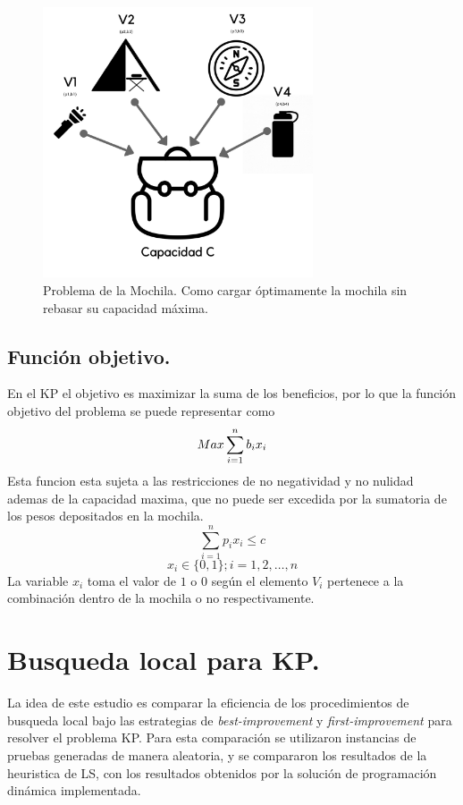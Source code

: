 \documentclass{ci5652}
\begin{document}
 	\begin{figure}[h]
 	\caption{Problema de la Mochila. Como cargar óptimamente la mochila sin rebasar su capacidad máxima.}
	\includegraphics[width=8cm, height=8cm]{KP.png}
	\end{figure}
	\subsection{Función objetivo.}
	En el KP el objetivo es maximizar la suma de los beneficios, por lo que la función objetivo del problema se puede representar como
	$$
		Max \sum_{i=1}^{n} b_i x_i \\
	$$
	Esta funcion esta sujeta a las restricciones de no negatividad y no nulidad ademas de la capacidad maxima, que no puede ser excedida por la sumatoria de los pesos depositados en la mochila.
	$$
		\sum_{i=1}^{n} p_i x_i \leq c
	$$
	$$
	x_i \in \{0,1\};i=1,2,\ldots,n
	$$
	La variable $x_i$ toma el valor de $1$ o $0$ según el elemento $V_i$ pertenece a la combinación dentro de la mochila o no respectivamente.

	\section{Busqueda local para KP.}
	La idea de este estudio es comparar la eficiencia de los procedimientos de busqueda local bajo las estrategias de \textit{best-improvement} y \textit{first-improvement} para resolver el problema KP. Para esta comparación se utilizaron instancias de pruebas generadas de manera aleatoria, y se compararon los resultados de la heuristica de LS, con los resultados obtenidos por la solución de programación dinámica implementada. 
\end{document}
